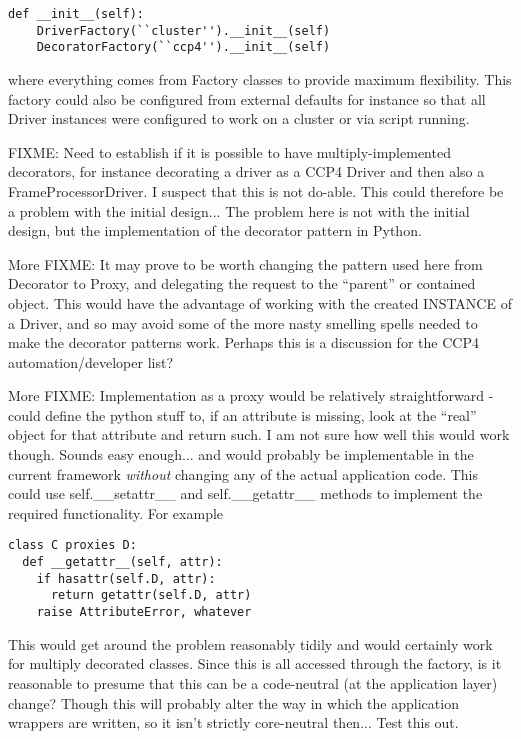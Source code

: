 \documentclass[a4paper, 11pt]{article}
\begin{document}
\begin{verbatim}
def __init__(self):
    DriverFactory(``cluster'').__init__(self)
    DecoratorFactory(``ccp4'').__init__(self)
\end{verbatim}

\noindent
where everything comes from Factory classes to provide maximum flexibility.
This factory could also be configured from external defaults for instance 
so that all Driver instances were configured to work on a cluster or via script
running.

FIXME: Need to establish if it is possible to have multiply-implemented 
decorators, for instance decorating a driver as a CCP4 Driver and then
also a FrameProcessorDriver. I suspect that this is not do-able. This could
therefore be a problem with the initial design... The problem here is not
with the initial design, but the implementation of the decorator pattern
in Python.

More FIXME: It may prove to be worth changing the pattern used here from
Decorator to Proxy, and delegating the request to the ``parent'' or contained
object. This would have the advantage of working with the created INSTANCE
of a Driver, and so may avoid some of the more nasty smelling spells needed
to make the decorator patterns work. Perhaps this is a discussion for the
CCP4 automation/developer list?

More FIXME: Implementation as a proxy would be relatively straightforward - 
could define the python stuff to, if an attribute is missing, look at the
``real'' object for that attribute and return such. I am not sure how well
this would work though. Sounds easy enough... and would probably be
implementable in the current framework \emph{without} changing any of the
actual application code. This could use self.\_\_setattr\_\_ and 
self.\_\_getattr\_\_ methods to implement the required functionality.
For example

{
\small
\begin{verbatim}
class C proxies D:
  def __getattr__(self, attr):
    if hasattr(self.D, attr):
      return getattr(self.D, attr)
    raise AttributeError, whatever
\end{verbatim}
}

This would get around the problem reasonably tidily and would certainly
work for multiply decorated classes. Since this is all accessed through
the factory, is it reasonable to presume that this can be a code-neutral
(at the application layer) change? Though this will probably alter the way 
in which the application wrappers are written, so it isn't strictly 
core-neutral then... Test this out. 
\end{document}
